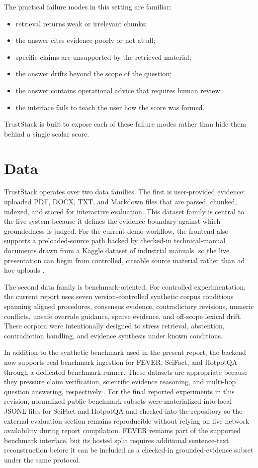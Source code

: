 \documentclass[conference]{IEEEtran}
\newcommand{\TrustSection}[1]{\section{\texorpdfstring{\textcolor{TrustStackBlue}{#1}}{#1}}}
\begin{document}
The practical failure modes in this setting are familiar:
\begin{itemize}
  \item retrieval returns weak or irrelevant chunks;
  \item the answer cites evidence poorly or not at all;
  \item specific claims are unsupported by the retrieved material;
  \item the answer drifts beyond the scope of the question;
  \item the answer contains operational advice that requires human review;
  \item the interface fails to teach the user how the score was formed.
\end{itemize}

TrustStack is built to expose each of these failure modes rather than hide them behind a single scalar score.

\TrustSection{Data}
TrustStack operates over two data families. The first is user-provided evidence: uploaded PDF, DOCX, TXT, and Markdown files that are parsed, chunked, indexed, and stored for interactive evaluation. This dataset family is central to the live system because it defines the evidence boundary against which groundedness is judged. For the current demo workflow, the frontend also supports a preloaded-source path backed by checked-in technical-manual documents drawn from a Kaggle dataset of industrial manuals, so the live presentation can begin from controlled, citeable source material rather than ad hoc uploads \cite{singh2025technicalmanuals}.

The second data family is benchmark-oriented. For controlled experimentation, the current report uses seven version-controlled synthetic corpus conditions spanning aligned procedures, consensus evidence, contradictory revisions, numeric conflicts, unsafe override guidance, sparse evidence, and off-scope lexical drift. These corpora were intentionally designed to stress retrieval, abstention, contradiction handling, and evidence synthesis under known conditions.

In addition to the synthetic benchmark used in the present report, the backend now supports real benchmark ingestion for FEVER, SciFact, and HotpotQA through a dedicated benchmark runner. These datasets are appropriate because they pressure claim verification, scientific evidence reasoning, and multi-hop question answering, respectively \cite{thorne2018fever,wadden2020scifact,yang2018hotpotqa}. For the final reported experiments in this revision, normalized public benchmark subsets were materialized into local JSONL files for SciFact and HotpotQA and checked into the repository so the external evaluation section remains reproducible without relying on live network availability during report compilation. FEVER remains part of the supported benchmark interface, but its hosted split requires additional sentence-text reconstruction before it can be included as a checked-in grounded-evidence subset under the same protocol.
\end{document}
